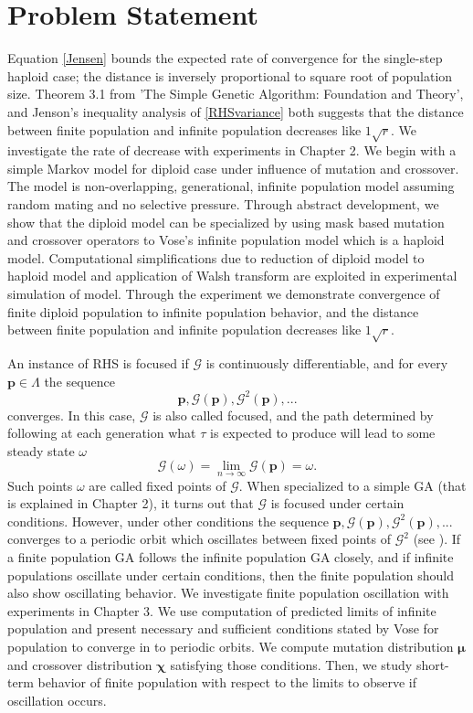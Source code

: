 \section{Problem Statement}
Equation \ref{Jensen} bounds the expected rate of convergence for the single-step haploid case; 
the distance is inversely proportional to square root of population size. 
Theorem 3.1 from 'The Simple Genetic Algorithm: Foundation and Theory', 
and Jenson's inequality analysis of \ref{RHSvariance} both suggests that the distance between finite population and infinite population decreases like  
$1\sqrt{r}$. We investigate the rate of decrease with experiments in Chapter 2. 
We begin with a simple Markov model for diploid case under influence of mutation and crossover. 
The model is non-overlapping, generational, infinite population model assuming random mating and no selective pressure. 
Through abstract development, we show that the diploid model can be specialized by using mask based 
mutation and crossover operators to Vose's infinite population model which is a haploid model. Computational 
simplifications due to reduction of diploid model to haploid model and application of Walsh transform 
are exploited in experimental simulation of model. Through the experiment we demonstrate convergence 
of finite diploid population to infinite population behavior, and the distance between finite population 
and infinite population decreases like $1\sqrt{r}$.

An instance of RHS is  focused if $\mathcal{G}$ is continuously differentiable, and for every $\bm{p}  \in  \Lambda$
the sequence
\[
\bm{p},  \mathcal{G}(\bm{p}),  {\mathcal{G}}^2(\bm{p}),...
\]
converges. In this case, $\mathcal{G}$ is also called focused, and the path determined by following at each generation what $\tau$ is expected 
to produce will lead to some steady state $\omega$
\[
\mathcal{G}(\omega) = \lim_{n\to\infty} \mathcal{G}(\bm{p}) = \omega.
\]
Such points $\omega$ are called fixed points of $\mathcal{G}$. 
When specialized to a simple GA (that is explained in Chapter 2), it turns out that $ \mathcal{G}$ is focused under certain conditions. 
However, under other conditions the sequence 
$\bm{p},  \mathcal{G}(\bm{p}),  {\mathcal{G}}^2(\bm{p}),...$ converges 
to a periodic orbit which oscillates between fixed points of $\mathcal{G}^2$ (see \cite{Vose1999}). 
If a finite population GA follows the infinite population GA closely, and if infinite populations oscillate under certain conditions, then 
the finite population should also show oscillating behavior. We investigate finite population oscillation with experiments 
in Chapter 3. We use computation of predicted limits
of infinite population and present necessary and sufficient conditions stated by Vose for population
to converge in to periodic orbits. We compute mutation distribution $\bm{\mu}$ and crossover distribution $\bm{\chi}$ 
satisfying those conditions. Then, we study short-term behavior of finite population with respect to the limits to observe if oscillation occurs.


